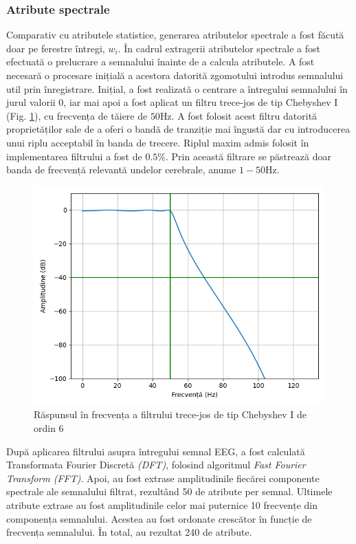 \subsubsection*{Atribute spectrale}
Comparativ cu atributele statistice, generarea atributelor spectrale a fost făcută doar pe ferestre întregi, $w_i$. În cadrul extragerii atributelor spectrale a fost efectuată o prelucrare a semnalului înainte de a calcula atributele. A fost necesară o procesare inițială a acestora datorită zgomotului introdus semnalului util prin înregistrare. Inițial, a fost realizată o centrare a întregului semnalului în jurul valorii $0$, iar mai apoi a fost aplicat un filtru trece-jos de tip Chebyshev I (Fig. \ref{fig:cheb1-filt}), cu frecvența de tăiere de $50\si{\hertz}$. A fost folosit acest filtru datorită proprietăților sale de a oferi o bandă de tranziție mai îngustă dar cu introducerea unui riplu acceptabil în banda de trecere. Riplul maxim admis folosit în implementarea filtrului a fost de $0.5\%$. Prin această filtrare se păstrează doar banda de frecvență relevantă undelor cerebrale, anume $1-50\si{\hertz}$.
\begin{figure}[ht]
\centering
\includegraphics[width=\textwidth, keepaspectratio]{fig/cap3/cheb1-filt.png}
\caption{Răspunsul în frecvența a filtrului trece-jos de tip Chebyshev I de ordin 6}
\label{fig:cheb1-filt}
\end{figure}

După aplicarea filtrului asupra întregului semnal EEG, a fost calculată Transformata Fourier Discretă \textit{(DFT)}, folosind algoritmul \textit{Fast Fourier Transform (FFT)}. Apoi, au fost extrase amplitudinile fiecărei componente spectrale ale semnalului filtrat, rezultând 50 de atribute per semnal. Ultimele atribute extrase au fost amplitudinile celor mai puternice 10 frecvențe din componența semnalului. Acestea au fost ordonate crescător în funcție de frecvența semnalului. În total, au rezultat 240 de atribute.


